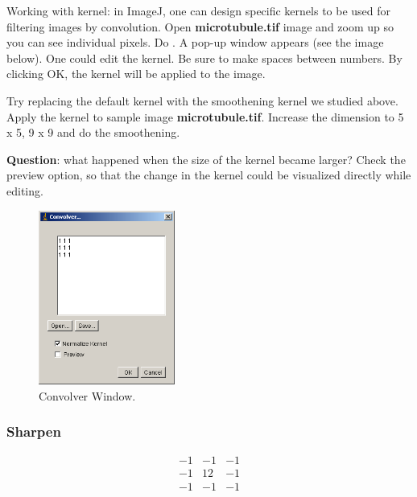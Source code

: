 \begin{indentexercise}{1}
 Working with kernel: in ImageJ, one can
design specific kernels to be used for filtering images by convolution.
Open \textbf{microtubule.tif} image and
zoom up so you can see individual pixels. Do . A pop-up window
appears (see the image below). One could edit the kernel. Be sure to
make spaces between numbers. By clicking OK, the kernel will be applied
to the image. 

Try replacing the default kernel with the smoothening kernel we studied
above. Apply the kernel to sample image
\textbf{microtubule.tif}. Increase the
dimension to 5 x 5, 9 x 9 and do the smoothening. 

\textbf{Question}: what happened when the size of the kernel became
larger? Check the preview option, so that the change in the kernel
could be visualized directly while editing.

\begin{figure}[htbp]
\begin{center}
\includegraphics[width=4.471cm]{fig/CMCIBasicCourse201102-img57.png}
\caption{ Convolver Window.}
\label{fig:img57}
\end{center}
\end{figure} 

\end{indentexercise}

\subsubsection{Sharpen }

\[
 \begin{matrix}
  -1 & -1 & -1 \\
  -1 & 12 & -1 \\
  -1 & -1 & -1
 \end{matrix}
\]

